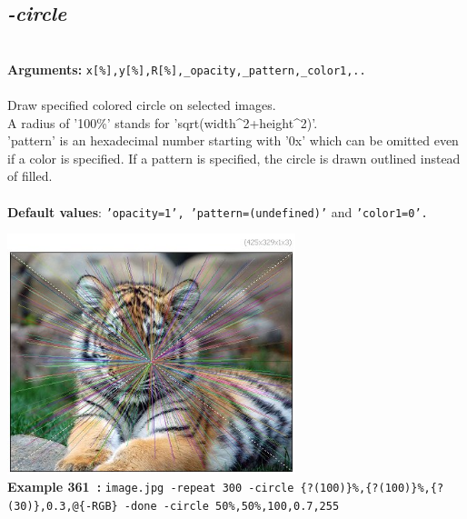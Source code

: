 \documentclass[a4paper,11pt,twoside]{book}
\begin{document}
\subsection{\emph{-circle} }\vspace*{-0.5em}
~\\\textbf{Arguments: } 
{\small \texttt{x[\%],y[\%],R[\%],\_opacity,\_pattern,\_color1,..}}\\~\\
Draw specified colored circle on selected images.
~\\A radius of '100\%' stands for 'sqrt(width\textasciicircum 2+height\textasciicircum 2)'.
~\\'pattern' is an hexadecimal number starting with '0x' which can be omitted
even if a color is specified. If a pattern is specified, the circle is
drawn outlined instead of filled.
~\\~\\\textbf{Default values}: {\small \texttt{'opacity=1', 'pattern=(undefined)'} and \texttt{'color1=0'.}}
\begin{center}\includegraphics[keepaspectratio=true,height=7cm,width=\textwidth]{img/gmic_def361.jpg}\\
{\footnotesize \textbf{Example 361~:} \texttt{image.jpg -repeat 300 -circle \{?(100)\}\%,\{?(100)\}\%,\{?(30)\},0.3,@\{-RGB\} -done -circle 50\%,50\%,100,0.7,255}}
\end{center}
\end{document}
